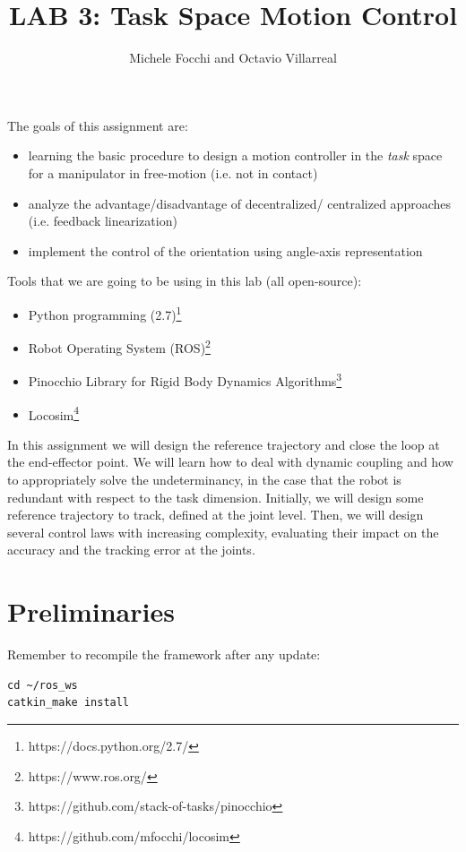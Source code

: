\documentclass[11pt]{article}
\title{LAB 3: Task Space Motion Control}
\author{Michele Focchi and Octavio Villarreal}
\date{}
\begin{document}
	\maketitle
	\noindent
	The goals of this assignment are:
	\begin{itemize}
		\item learning the basic procedure to design a motion controller in the \textit{task} space for a manipulator in free-motion (i.e. not in contact)
		\item analyze the advantage/disadvantage of decentralized/ centralized approaches (i.e. feedback linearization)
		\item implement the control of the orientation using angle-axis representation
	\end{itemize}
	
	\noindent
	Tools that we are going to be using in this lab (all open-source):
	\begin{itemize}
		\item Python programming (2.7)\footnote{https://docs.python.org/2.7/}
		\item Robot Operating System (ROS)\footnote{https://www.ros.org/}
		\item Pinocchio Library for Rigid Body Dynamics Algorithms\footnote{https://github.com/stack-of-tasks/pinocchio}
		\item Locosim\footnote{https://github.com/mfocchi/locosim}
	\end{itemize}
	In this assignment we will design the reference trajectory and close the loop at the end-effector point. We will learn how to deal with dynamic 
	coupling and how to appropriately solve the undeterminancy, in the case that the  
	robot is redundant with respect to the task dimension. Initially, 
	we will design some reference trajectory to track, defined at the joint level. 
	Then, we will design several control laws with increasing complexity, 
	evaluating their impact on the accuracy and the tracking error at the joints.

\section{Preliminaries}
Remember to recompile the framework after any update:

\begin{verbatim}
cd ~/ros_ws
catkin_make install
\end{verbatim}
\end{document}
